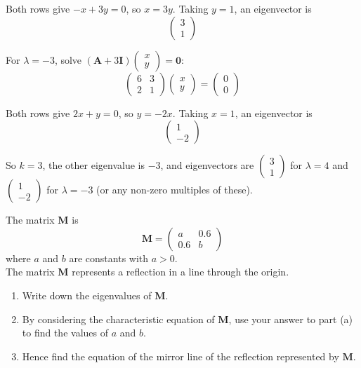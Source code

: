 \documentclass[leqno]{article}
\begin{document}
\begin{enumerate}[
  label=\textbf{\arabic*.},
  leftmargin=*,
  topsep=0pt,
  partopsep=0pt,
  parsep=0pt
]
\begin{djsSolution}
Both rows give \(-x+3y=0\), so \(x=3y\). Taking \(y=1\), an eigenvector is
\[
\begin{pmatrix}3\\1\end{pmatrix}
\]

For \(\lambda=-3\), solve \((\mathbf{A}+3\mathbf{I})\begin{pmatrix}x\\y\end{pmatrix}=\mathbf{0}\):
\[
\begin{pmatrix} 6 & 3 \\ 2 & 1 \end{pmatrix}\begin{pmatrix}x\\y\end{pmatrix}=\begin{pmatrix}0\\0\end{pmatrix}
\]

Both rows give \(2x+y=0\), so \(y=-2x\). Taking \(x=1\), an eigenvector is
\[
\begin{pmatrix}1\\-2\end{pmatrix}
\]

So \(k=3\), the other eigenvalue is \(-3\), and eigenvectors are \(\begin{pmatrix}3\\1\end{pmatrix}\) for \(\lambda=4\) and \(\begin{pmatrix}1\\-2\end{pmatrix}\) for \(\lambda=-3\) (or any non-zero multiples of these).
\end{djsSolution}

\newpage

\questionitem

The matrix $\mathbf{M}$ is
\[\mathbf{M} = \begin{pmatrix} a & 0.6 \\ 0.6 & b \end{pmatrix}\]
where $a$ and $b$ are constants with $a > 0$. \\

The matrix $\mathbf{M}$ represents a reflection in a line through the origin. \\
\begin{enumerate}[label=\textbf{(\alph*)}]
  \item Write down the eigenvalues of $\mathbf{M}$.  \\
  \item By considering the characteristic equation of $\mathbf{M}$, use your answer to part (a) to find the values of $a$ and $b$.  \\
  \item Hence find the equation of the mirror line of the reflection represented by $\mathbf{M}$.  \\
\end{enumerate}


\end{enumerate}
\end{document}
